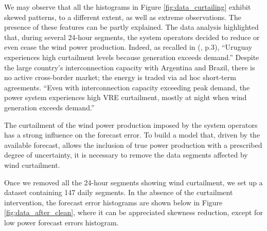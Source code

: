 \documentclass[11pt]{article}
\theoremstyle{definition}
\begin{document}
We may observe that all the histograms in Figure \ref{fig:data_curtailing} exhibit skewed patterns, to a different extent, as well as extreme observations. The presence of these features can be partly explained. The data analysis highlighted that, during several 24-hour segments, the system operators decided to reduce or even cease the wind power production. Indeed, as recalled in (\cite{irena2}, p.3), ``Uruguay experiences high curtailment levels because generation exceeds demand.'' Despite the large country's interconnection capacity with Argentina and Brazil, there is no active cross-border market; the energy is traded via ad hoc short-term agreements. ``Even with interconnection capacity exceeding peak demand, the power system experiences high VRE curtailment, mostly at night when wind generation exceeds demand.''
  
The curtailment of the wind power production imposed by the system operators has a strong influence on the forecast error. To build a model that, driven by the available forecast, allows the inclusion of true power production with a prescribed degree of uncertainty, it is necessary to remove the data segments affected by wind curtailment.

Once we removed all the 24-hour segments showing wind curtailment, we set up a dataset containing 147 daily segments. 
In the absence of the curtailment intervention, the forecast error histograms are shown below in Figure \ref{fig:data_after_clean}, where it can be appreciated skewness reduction, except for low power forecast errors histogram.
\end{document}
